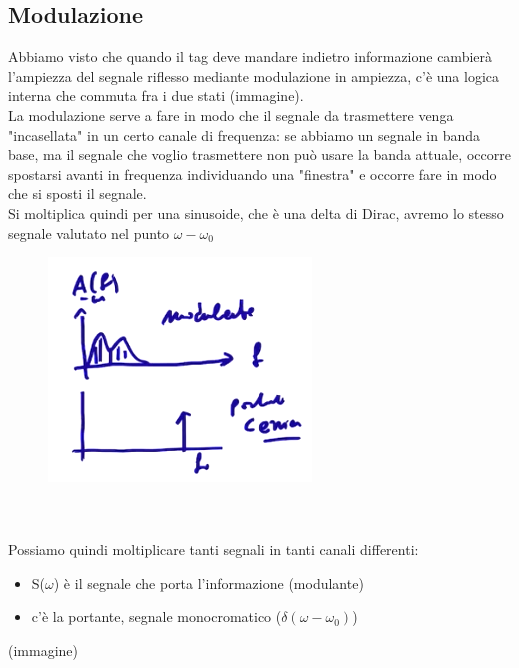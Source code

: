 \documentclass[oneside, 12pt]{extbook}
\begin{document}
\subsection{Modulazione}
Abbiamo visto che quando il tag deve mandare indietro informazione cambierà l'ampiezza del segnale riflesso mediante modulazione in ampiezza, c'è una logica interna che commuta fra i due stati (immagine).\\La modulazione serve a fare in modo che il segnale da trasmettere venga "incasellata" in un certo canale di frequenza: se abbiamo un segnale in banda base, ma il segnale che voglio trasmettere non può usare la banda attuale, occorre spostarsi avanti in frequenza individuando una "finestra" e occorre fare in modo che si sposti il segnale.\\Si moltiplica quindi per una sinusoide, che è una delta di Dirac, avremo lo stesso segnale valutato nel punto $\omega - \omega_0$\\
\begin{figure}[!h]
	\includegraphics[scale=0.4]{immagini/modulazione.png}
\end{figure}
\\\\Possiamo quindi moltiplicare tanti segnali in tanti canali differenti:
\begin{itemize}
	\item S($\omega$) è il segnale che porta l'informazione (modulante)
	\item c'è la portante, segnale monocromatico ($\delta(\omega - \omega_0)$)
\end{itemize}
(immagine)
\end{document}
